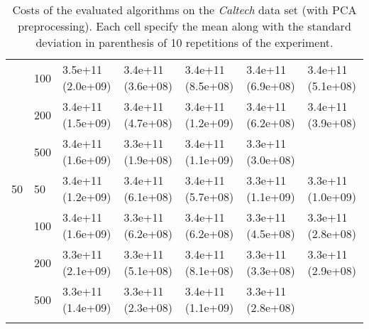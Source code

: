 \begin{longtable}{lllllll}
   & 100 &  3.5e+11 (2.0e+09) &  3.4e+11 (3.6e+08) &  3.4e+11 (8.5e+08) &    3.4e+11 (6.9e+08) &  3.4e+11 (5.1e+08) \\
   & 200 &  3.4e+11 (1.5e+09) &  3.4e+11 (4.7e+08) &  3.4e+11 (1.2e+09) &    3.4e+11 (6.2e+08) &  3.4e+11 (3.9e+08) \\
   & 500 &  3.4e+11 (1.6e+09) &  3.3e+11 (1.9e+08) &  3.4e+11 (1.1e+09) &    3.3e+11 (3.0e+08) &       \\
 \midrule
50 & 50  &  3.4e+11 (1.2e+09) &  3.4e+11 (6.1e+08) &  3.4e+11 (5.7e+08) &    3.3e+11 (1.1e+09) &  3.3e+11 (1.0e+09) \\
   & 100 &  3.4e+11 (1.6e+09) &  3.3e+11 (6.2e+08) &  3.4e+11 (6.2e+08) &    3.3e+11 (4.5e+08) &  3.3e+11 (2.8e+08) \\
   & 200 &  3.3e+11 (2.1e+09) &  3.3e+11 (5.1e+08) &  3.4e+11 (8.1e+08) &    3.3e+11 (3.3e+08) &  3.3e+11 (2.9e+08) \\
   & 500 &  3.3e+11 (1.4e+09) &  3.3e+11 (2.3e+08) &  3.4e+11 (1.1e+09) &    3.3e+11 (2.8e+08) &                 \\
\bottomrule
\caption{Costs of the evaluated algorithms on the \textit{Caltech} data set (with PCA preprocessing). Each cell specify the mean along with the standard deviation in parenthesis of 10 repetitions of the experiment.}
\label{tab:real-cost-mean-std-caltech-pca}
\end{longtable}


